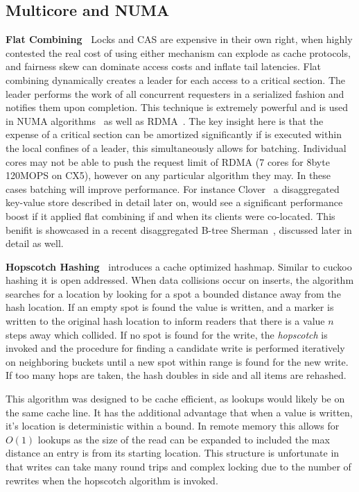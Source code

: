 \subsection{Multicore and NUMA}

\textbf{Flat Combining~\cite{flat-combine}} Locks and CAS are expensive in their
own right, when highly contested the real cost of using either mechanism can
explode as cache protocols, and fairness skew can dominate access costs and
inflate tail latencies. Flat combining dynamically creates a leader for each
access to a critical section. The leader performs the work of all concurrent
requesters in a serialized fashion and notifies them upon completion. This
technique is extremely powerful and is used in NUMA
algorithms~\cite{black-box-numa} as well as RDMA~\cite{flock}. The key insight
here is that the expense of a critical section can be amortized significantly if
is executed within the local confines of a leader, this simultaneously allows
for batching. Individual cores may not be able to push the request limit of RDMA
(7 cores for 8byte 120MOPS on CX5), however on any particular algorithm they
may. In these cases batching will improve performance. For instance 
Clover~\cite{clover} a disaggregated key-value store described in detail later
on, would see a significant performance boost if it applied flat combining if
and when its clients were co-located. This benifit is showcased in a recent
disaggregated B-tree Sherman~\cite{sherman}, discussed later in detail as well.

\textbf{Hopscotch Hashing~\cite{hopscotch}} introduces a cache optimized
hashmap. Similar to cuckoo hashing it is open addressed. When data collisions
occur on inserts, the algorithm searches for a location by looking for a spot a
bounded distance away from the hash location. If an empty spot is found the
value is written, and a marker is written to the original hash location to
inform readers that there is a value $n$ steps away which collided. If no spot
is found for the write, the \textit{hopscotch} is invoked and the procedure for
finding a candidate write is performed iteratively on neighboring buckets until
a new spot within range is found for the new write. If too many hops are taken,
the hash doubles in side and all items are rehashed.

This algorithm was designed to be cache efficient, as lookups would likely be on
the same cache line. It has the additional advantage that when a value is
written, it's location is deterministic within a bound. In remote memory this
allows for $O(1)$ lookups as the size of the read can be expanded to included
the max distance an entry is from its starting location. This structure is
unfortunate in that writes can take many round trips and complex locking due to
the number of rewrites when the hopscotch algorithm is invoked.


